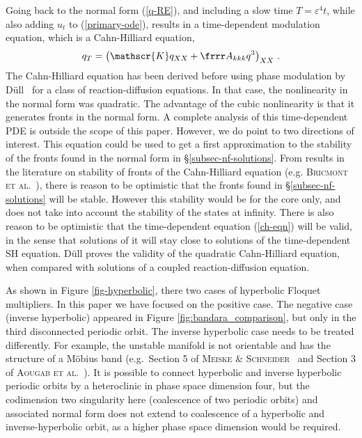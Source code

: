 \documentclass[10pt]{article}
\def\eps{{\varepsilon}} \def\reps{\textcolor{red}{{\varepsilon}}}
\begin{document}
 Going back to the normal form (\ref{q-RE}), and including a slow time
$T=\eps^4t$, while also adding $u_t$ to (\ref{primary-ode}), results in a
time-dependent modulation equation, which is a Cahn-Hilliard equation,
%
\begin{equation}\label{ch-eqn}
q_T = \left( \mathscr{K}q_{XX} + \frrr A_{kkk} q^3\right)_{XX}\,.
\end{equation}
%
The Cahn-Hilliard equation has been derived before using phase modulation by
D\"ull~\cite{dull07} for a class of reaction-diffusion equations. In that case,
the nonlinearity in the normal form was quadratic. The advantage of the cubic nonlinearity is that it generates fronts in the normal form. A complete analysis of this time-dependent PDE is outside the scope of this
paper.  However, we do point to two directions of interest.  This equation could
be used to get a first approximation to the stability of the fronts found in the
normal form in \S \ref{subsec-nf-solutions}.  From results in the literature on
stability of fronts of the Cahn-Hilliard equation (e.g. \textsc{Bricmont et al.}~\cite{bkt99}), there is
reason to be optimistic that the fronts found in \S\ref{subsec-nf-solutions}
will be stable. However this stability would be for the core only, and does not take into account the stability of the states at infinity. There is also reason to be optimistic that the time-dependent equation
(\ref{ch-eqn}) will be valid, in the sense that solutions of it will stay
close to solutions of the time-dependent SH equation.  D\"ull \cite{dull07} proves the validity
of the quadratic Cahn-Hilliard equation, when compared with solutions of a
coupled reaction-diffusion equation.

 As shown in Figure \ref{fig-hyperbolic}, there two cases of hyperbolic Floquet multipliers. In this paper we have focused on the positive case.  The negative case (inverse hyperbolic) appeared in Figure \ref{fig:bandara_comparison}, but only in the third disconnected periodic orbit. The inverse hyperbolic case needs to be treated differently. For example, the unstable manifold is not orientable and has the structure of a M\"obius band (e.g.\ Section 5 of \textsc{Meiske \& Schneider}~\cite{ms87} and Section 3 of \textsc{Aougab et al.}~\cite{abcdssw19}).  It is possible to connect hyperbolic and inverse hyperbolic periodic orbits by a heteroclinic in phase space dimension four, but the codimension two singularity here (coalescence of two periodic orbits) and associated normal form does not extend to coalescence of a hyperbolic and inverse-hyperbolic orbit, as a higher phase space dimension would be required.
\end{document}
